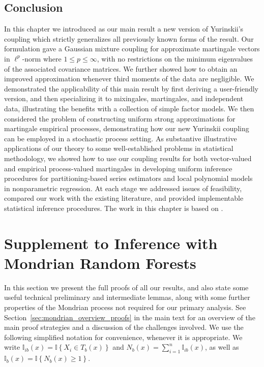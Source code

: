 \documentclass[11pt,lof]{puthesis}
\newcommand{\I}{\ensuremath{\mathbb{I}}}
\theoremstyle{break}
\theoremstyle{proof}
\begin{document}
\section{Conclusion}
\label{sec:yurinskii_conclusion}

In this chapter we introduced as our main result a new version of Yurinskii's
coupling which strictly generalizes all previously known forms of the result.
Our formulation gave a Gaussian mixture coupling for approximate martingale
vectors in $\ell^p$-norm where $1 \leq p \leq \infty$, with no restrictions on
the minimum eigenvalues of the associated covariance matrices. We further
showed how to obtain an improved approximation whenever third moments of the
data are negligible. We demonstrated the applicability of this main result by
first deriving a user-friendly version, and then specializing it to mixingales,
martingales, and independent data, illustrating the benefits with a collection
of simple factor models. We then considered the problem of constructing uniform
strong approximations for martingale empirical processes, demonstrating how our
new Yurinskii coupling can be employed in a stochastic process setting. As
substantive illustrative applications of our theory to some
well-established problems in statistical methodology, we showed how to use our
coupling results for both vector-valued and empirical process-valued
martingales in developing uniform inference procedures for partitioning-based
series estimators and local polynomial models in nonparametric regression. At
each stage we addressed issues of feasibility, compared our work with the
existing literature, and provided implementable statistical inference
procedures. The work in this chapter is based on \citet{cattaneo2022yurinskii}.

\appendix


\chapter{Supplement to Inference with Mondrian Random Forests}
\label{app:mondrian}

In this section we present the full proofs of all our results,
and also state some useful technical preliminary and
intermediate lemmas, along with some further properties
of the Mondrian process not required for our primary analysis.
See Section~\ref{sec:mondrian_overview_proofs} in the main text
for an overview of the main proof strategies and a discussion of
the challenges involved.
We use the following simplified notation for convenience,
whenever it is appropriate.
We write $\I_{i b}(x) = \I \left\{ X_i \in T_b(x) \right\}$
and $N_b(x) = \sum_{i=1}^{n} \I_{i b}(x)$,
as well as $\I_b(x) = \I \left\{ N_b(x) \geq 1 \right\}$.
\end{document}
